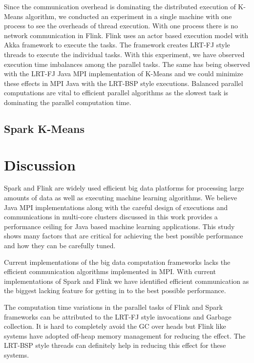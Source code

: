 \documentclass[10pt, conference, compsocconf]{IEEEtran}
\begin{document}
Since the communication overhead is dominating the distributed execution of K-Means algorithm, we conducted an experiment in a single machine with one process to see the overheads of thread execution. With one process there is no network communication in Flink. Flink uses an actor based execution model with Akka framework to execute the tasks. The framework creates \ac{LRT-FJ} style threads to execute the individual tasks. With this experiment, we have observed execution time imbalances among the parallel tasks. The same has being observed with the \ac{LRT-FJ} Java MPI implementation of K-Means and we could minimize these effects in MPI Java with the \ac{LRT-BSP} style executions. Balanced parallel computations are vital to efficient parallel algorithms as the slowest task is dominating the parallel computation time. 

\subsection{Spark K-Means}



\section{Discussion}
Spark and Flink are widely used efficient big data platforms for processing large amounts of data as well as executing machine learning algorithms. We believe Java MPI implementations along with the careful design of executions and communications in multi-core clusters discussed in this work provides a performance ceiling for Java based machine learning applications. This study shows many factors that are critical for achieving the best possible performance and how they can be carefully tuned. 

Current implementations of the big data computation frameworks lacks the efficient communication algorithms implemented in MPI. With current implementations of Spark and Flink we have identified efficient communication as the biggest lacking feature for getting in to the best possible performance. 

The computation time variations in the parallel tasks of Flink and Spark frameworks can be attributed to the \ac{LRT-FJ} style invocations and Garbage collection. It is hard to completely avoid the GC over heads but Flink like systems have adopted off-heap memory management for reducing the effect. The \ac{LRT-BSP} style threads can definitely help in reducing this effect for these systems.  
\end{document}
